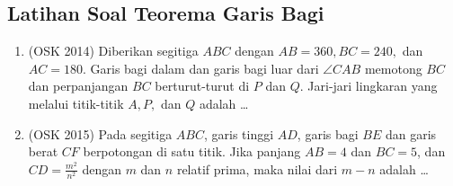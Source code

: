 \subsection{Latihan Soal Teorema Garis Bagi}
\begin{enumerate}
    \item (OSK 2014) Diberikan segitiga $ABC$ dengan $AB = 360, BC = 240,$ dan $AC = 180$. Garis bagi dalam dan garis bagi luar dari $\angle CAB$ memotong $BC$ dan perpanjangan $BC$ berturut-turut di $P$ dan $Q$. Jari-jari lingkaran yang melalui titik-titik $A, P,$ dan $Q$ adalah \dots
    
    \item (OSK 2015) Pada segitiga $ABC$, garis tinggi $AD$, garis bagi $BE$ dan garis berat $CF$ berpotongan di satu titik. Jika panjang $AB = 4$ dan $BC = 5$, dan $CD = \frac{m^2}{n^2}$ dengan $m$ dan $n$ relatif prima, maka nilai dari $m - n$ adalah \ldots
\end{enumerate}